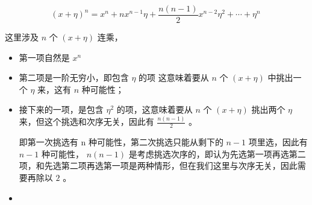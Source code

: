 \begin{equation}
(x + \eta)^n = x^n + nx^{n-1}\eta + \frac{n(n-1)}{2} x^{n-2} \eta^2 + \cdots + \eta^n~
\end{equation}

这里涉及 $n$ 个 $(x + \eta)$ 连乘，

\begin{itemize}
\item  第⼀项自然是 $x^n$

\item 第⼆项是⼀阶⽆穷小，即包含 $\eta$ 的项 这意味着要从  $n$ 个 $(x + \eta)$ 中挑出⼀个 $\eta$ 来，这有 $n$ 种可能性；

\item 接下来的⼀项，是包含 $\eta^2$ 的项，这意味着要从 $n$ 个 $(x + \eta)$ 挑出两个 $\eta$ 来，但这个挑选和次序⽆关，因此有 $\frac{n\left(n-1 \right)}{2}$ 。

即第⼀次挑选有 n 种可能性，第⼆次挑选只能从剩下的 $n − 1$ 项里选，因此有 $n − 1$ 种可能性，
$n(n-1)$ 是考虑挑选次序的，即认为先选第⼀项再选第⼆项，和先选第⼆项再选第⼀项是两种情形，但在我们这里与次序⽆关，因此需要再除以 $2$ 。

\item 
\end{itemize}
